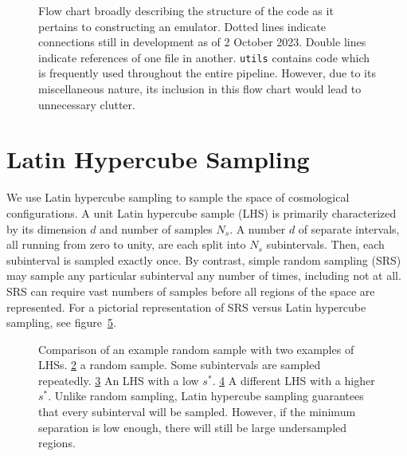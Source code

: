 \begin{figure}[ht!]
    \centering
 	
 	\caption[CL Flow Chart]{Flow chart broadly describing the structure
 		of the
 		code as it pertains to constructing an emulator. Dotted lines
 		indicate connections still in development as of 2 October 2023.
 		Double lines indicate references of one file in another.
 		\Verb|utils| contains code which is frequently used throughout
 		the entire pipeline. However, due to its miscellaneous nature, its
 		inclusion in this flow chart would lead to unnecessary clutter.}
 	\label{fig: flow_chart}
\end{figure}

\section{Latin Hypercube Sampling}
\label{sec: lhc}

We use Latin hypercube sampling to sample 
the space of cosmological configurations.
A unit Latin hypercube sample (LHS) is primarily characterized by its 
dimension $d$ and number of samples $N_s$. A number $d$ of separate intervals, 
all running from zero to unity, are
each split into $N_s$ subintervals. Then, each subinterval is sampled
exactly once. By contrast, simple random sampling (SRS) may sample any 
particular subinterval any number of times, including not at all. SRS
can require vast numbers of samples before all regions of the space are
represented. For a pictorial representation of SRS versus Latin hypercube
sampling, see figure~\ref{fig: sample_comparison}.

\begin{figure}[ht!]
    \begin{subfigure}{0.32 \textwidth}
    \centering
 		
 		\caption{}
 		\label{fig: random_sample}
    \end{subfigure}
    \begin{subfigure}{0.32 \textwidth}
    \centering
 		
 		\caption{}
 		\label{fig: poor_lhs}
    \end{subfigure}
    \begin{subfigure}{0.32 \textwidth}
    \centering
 		
 		\caption{}
 		\label{fig: better_lhs}
    \end{subfigure}
    \centering
    \caption[Comparison of SRS and Latin hypercube sampling.]{Comparison of an 
    example
    	random sample with two examples of LHSs.
    	\ref{fig: random_sample} a random sample.
    	Some subintervals are sampled repeatedly.
	\ref{fig: poor_lhs} An LHS with a low $s^*$.    	
    	\ref{fig: better_lhs} A different LHS with a higher $s^*$.
    	Unlike random sampling,
    	Latin hypercube sampling guarantees that every subinterval will be 
    	sampled. However, if
    	the minimum separation is low enough, there will still be large
    	undersampled regions.}
    \label{fig: sample_comparison}
\end{figure}

